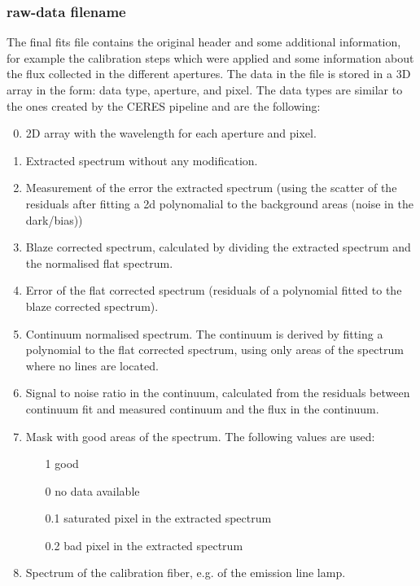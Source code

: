\documentclass[10pt,a4paper]{article}
\begin{document}
\subsubsection*{raw-data filename}
\label{section:extraction_data_format}
The final fits file contains the original header and some additional information, for example the calibration steps which were applied and some information about the flux collected in the different apertures. The data in the file is stored in a 3D array in the form: data type, aperture, and pixel. The data types are similar to the ones created by the CERES pipeline and are the following:
\begin{enumerate}
  \setcounter{enumi}{-1}
  \item 2D array with the wavelength for each aperture and pixel.
  \item Extracted spectrum without any modification.
  \item Measurement of the error the extracted spectrum (using the scatter of the residuals after fitting a 2d polynomalial to the background areas (noise in the dark/bias))
  \item Blaze corrected spectrum, calculated by dividing the extracted spectrum and the normalised flat spectrum.
  \item Error of the flat corrected spectrum (residuals of a polynomial fitted to the blaze corrected spectrum).
  \item Continuum normalised spectrum. The continuum is derived by fitting a polynomial to the flat corrected spectrum, using only areas of the spectrum where no lines are located. 
  \item Signal to noise ratio in the continuum, calculated from the residuals between continuum fit and measured continuum and the flux in the continuum.
  \item Mask with good areas of the spectrum. The following values are used:
  \begin{itemize}
    \item[1] good
    \item[0] no data available
    \item[0.1] saturated pixel in the extracted spectrum
    \item[0.2] bad pixel in the extracted spectrum
  \end{itemize}
  \item Spectrum of the calibration fiber, e.g. of the emission line lamp.
\end{enumerate}
\end{document}
